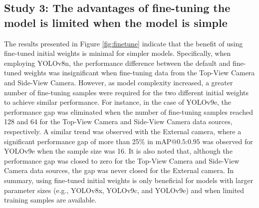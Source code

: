 
\subsection*{Study 3: The advantages of fine-tuning the model is limited when the model is simple}

The results presented in Figure \ref{fig:finetune} indicate that the benefit of using fine-tuned initial weights is minimal for simpler models. Specifically, when employing YOLOv8n, the performance difference between the default and fine-tuned weights was insignificant when fine-tuning data from the Top-View Camera and Side-View Camera. However, as model complexity increased, a greater number of fine-tuning samples were required for the two different initial weights to achieve similar performance. For instance, in the case of YOLOv9e, the performance gap was eliminated when the number of fine-tuning samples reached 128 and 64 for the Top-View Camera and Side-View Camera data sources, respectively. A similar trend was observed with the External camera, where a significant performance gap of more than 25\% in $\text{mAP@{0.5:0.95}}$ was observed for YOLOv9e when the sample size was 16. It is also noted that, although the performance gap was closed to zero for the Top-View Camera and Side-View Camera data sources, the gap was never closed for the External camera. In summary, using fine-tuned initial weights is only beneficial for models with larger parameter sizes (e.g., YOLOv8x, YOLOv9c, and YOLOv9e) and when limited training samples are available.

